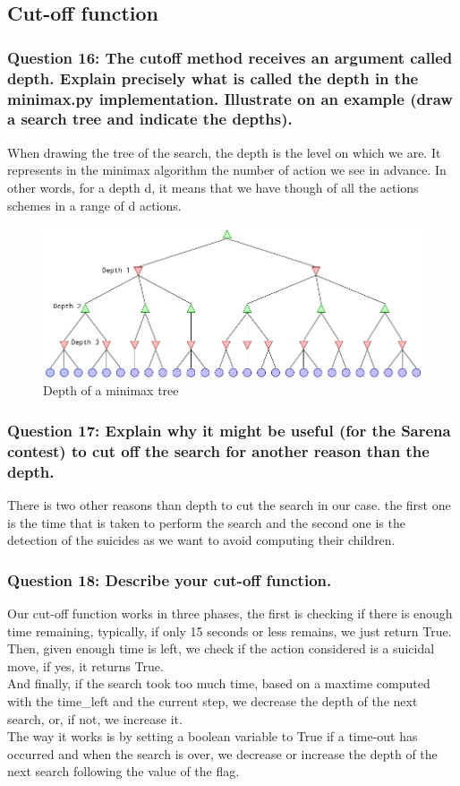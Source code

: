 \documentclass[a4paper,10pt]{article}
\begin{document}
			\subsection{Cut-off function}
				\subsubsection{Question 16: The cutoff method receives an argument called depth. Explain precisely what is called the depth in the minimax.py implementation. Illustrate on an example (draw a search tree and indicate the depths).}
					When drawing the tree of the search, the depth is the level on which we are. It represents in the minimax algorithm the number of action we see in advance. In other words, for a depth d, it means that we have though of all the actions schemes in a range of d actions.\\
					\begin{figure}[h!]
						\centering
							\includegraphics[scale=0.4]{arbre_depth.png}
						\caption{Depth of a minimax tree}
					\end{figure}
				\subsubsection{Question 17: Explain why it might be useful (for the Sarena contest) to cut off the search for another reason than the depth.}
					There is two other reasons than depth to cut the search in our case. the first one is the time that is taken to perform the search and the second one is the detection of the suicides as we want to avoid computing their children.
				\subsubsection{Question 18: Describe your cut-off function.}
					Our cut-off function works in three phases, the first is checking if there is enough time remaining, typically, if only 15 seconds or less remains, we just return True.
					Then, given enough time is left, we check if the action considered is a suicidal move, if yes, it returns True.\\
					And finally, if the search took too much time, based on a maxtime computed with the time\_left and the current step, we decrease the depth of the next search, or, if not, we increase it.\\
					The way it works is by setting a boolean variable to True if a time-out has occurred and when the search is over, we decrease or increase the depth of the next search following the value of the flag.
\end{document}
